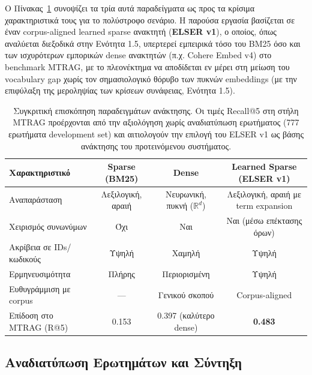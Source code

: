 Ο Πίνακας~\ref{tab:retrieval-comparison} συνοψίζει τα τρία αυτά παραδείγματα ως προς τα κρίσιμα χαρακτηριστικά τους για το πολύστροφο σενάριο. Η παρούσα εργασία βασίζεται σε έναν corpus-aligned learned sparse ανακτητή (\textbf{ELSER v1}), ο οποίος, όπως αναλύεται διεξοδικά στην Ενότητα 1.5, υπερτερεί εμπειρικά τόσο του BM25 όσο και των ισχυρότερων εμπορικών dense ανακτητών (π.χ. Cohere Embed v4) στο benchmark MTRAG, με το πλεονέκτημα να αποδίδεται εν μέρει στη μείωση του vocabulary gap χωρίς τον σημασιολογικό θόρυβο των πυκνών embeddings (με την επιφύλαξη της μεροληψίας των κρίσεων συνάφειας, Ενότητα 1.5).

\begin{table}[h]
\centering
\small
\begin{tabular}{lccc}
\toprule
\textbf{Χαρακτηριστικό} & \textbf{Sparse (BM25)} & \textbf{Dense} & \textbf{Learned Sparse (ELSER v1)} \\
\midrule
Αναπαράσταση & Λεξιλογική, αραιή & Νευρωνική, πυκνή ($\mathbb{R}^d$) & Λεξιλογική, αραιή με term expansion \\
Χειρισμός συνωνύμων & Όχι & Ναι & Ναι (μέσω επέκτασης όρων) \\
Ακρίβεια σε IDs/κωδικούς & Υψηλή & Χαμηλή & Υψηλή \\
Ερμηνευσιμότητα & Πλήρης & Περιορισμένη & Υψηλή \\
Ευθυγράμμιση με corpus & — & Γενικού σκοπού & Corpus-aligned \\
Επίδοση στο MTRAG (R@5) & 0.153 & 0.397 (καλύτερο dense) & \textbf{0.483} \\
\bottomrule
\end{tabular}
\caption{Συγκριτική επισκόπηση παραδειγμάτων ανάκτησης. Οι τιμές Recall@5 στη στήλη MTRAG προέρχονται από την αξιολόγηση χωρίς αναδιατύπωση ερωτήματος (777 ερωτήματα development set) και αιτιολογούν την επιλογή του ELSER v1 ως βάσης ανάκτησης του προτεινόμενου συστήματος.}
\label{tab:retrieval-comparison}
\end{table}

\subsection{Αναδιατύπωση Ερωτημάτων και Σύντηξη}

